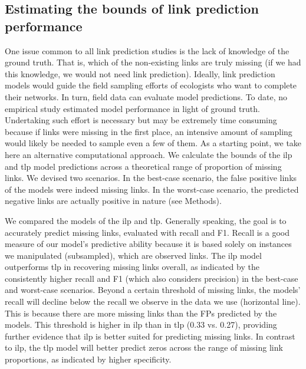 \documentclass[oneside, a4paper, onecolumn, 11pt]{article}
\begin{document}
\begin{refsection}
\subsection*{Estimating the bounds of link prediction performance}
One issue common to all link prediction studies is the lack of knowledge of the ground truth. That is, which of the non-existing links are truly missing (if we had this knowledge, we would not need link prediction). Ideally, link prediction models would guide the field sampling efforts of ecologists who want to complete their networks. In turn, field data can evaluate model predictions. To date, no empirical study estimated model performance in light of ground truth. Undertaking such effort is necessary but may be extremely time consuming because if links were missing in the first place, an intensive amount of sampling would likely be needed to sample even a few of them. As a starting point, we take here an alternative computational approach. We calculate the bounds of the \ac{ilp} and \ac{tlp} model predictions across a theoretical range of proportion of missing links. We devised two scenarios. In the best-case scenario, the false positive links of the models were indeed missing links. In the worst-case scenario, the predicted negative links are actually positive in nature (see Methods).

We compared the models of the \ac{ilp} and \ac{tlp}. Generally speaking, the goal is to accurately predict missing links, evaluated with recall and F1. Recall is a good measure of our model's predictive ability because it is based solely on instances we manipulated (subsampled), which are observed links. The \ac{ilp} model outperforms \ac{tlp} in recovering missing links overall, as indicated by the consistently higher recall and F1 (which also considers precision) in the best-case and worst-case scenarios. Beyond a certain threshold of missing links, the models' recall will decline below the recall we observe in the data we use (horizontal line). This is because there are more missing links than the FPs predicted by the models. This threshold is higher in \ac{ilp} than in \ac{tlp} (0.33 vs. 0.27), providing further evidence that \ac{ilp} is better suited for predicting missing links. In contrast to \ac{ilp}, the \ac{tlp} model will better predict zeros across the range of missing link proportions, as indicated by higher specificity.


\end{refsection}
\end{document}

